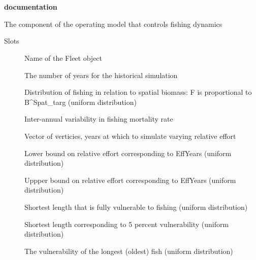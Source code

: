 \documentclass[a4paper]{book}
\begin{document}
\chapter*{}
\begin{center}
{\textbf{\huge \R{} documentation}} \par{}
\par\bigskip{\large \today}
\end{center}
%
\begin{Description}\relax
The component of the operating model that controls fishing dynamics
\end{Description}
%
\begin{Section}{Slots}

\begin{description}

\item[] Name of the Fleet object

\item[] The number of years for the historical simulation

\item[] Distribution of fishing in relation to spatial biomass: F is proportional to B\textasciicircum{}Spat\_targ (uniform distribution)

\item[] Inter-annual variability in fishing mortality rate

\item[] Vector of verticies, years at which to simulate varying relative effort

\item[] Lower bound on relative effort corresponding to EffYears (uniform distribution)

\item[] Uppper bound on relative effort corresponding to EffYears (uniform distribution)

\item[] Shortest length that is fully vulnerable to fishing (uniform distribution)

\item[] Shortest length corresponding to 5 percent vulnerability (uniform distribution)

\item[] The vulnerability of the longest (oldest) fish (uniform distribution)


\end{description}
\end{Section}
\end{document}
